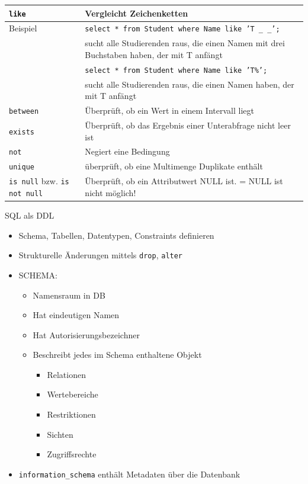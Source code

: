 \documentclass{article}
\begin{document}
\begin{center}
\begin{longtable}{|p{4cm}|p{7cm}|}
    \hline
    \texttt{like} & Vergleicht Zeichenketten \\
    \hline
    Beispiel & \texttt{select * from Student where Name like 'T \_ \_';} \\
    & sucht alle Studierenden raus, die einen Namen mit drei Buchstaben haben, der mit T anfängt\\
    & \texttt{select * from Student where Name like 'T\%';} \\
    & sucht alle Studierenden raus, die einen Namen haben, der mit T anfängt \\
    \hline
    \texttt{between} & Überprüft, ob ein Wert in einem Intervall liegt \\
    \hline
    \texttt{exists} & Überprüft, ob das Ergebnis einer Unterabfrage nicht leer ist \\
    \hline
    \texttt{not} & Negiert eine Bedingung \\
    \hline
    \texttt{unique} & überprüft, ob eine Multimenge Duplikate enthält \\
    \hline
    \texttt{is null} bzw. \texttt{is not null} & Überprüft, ob ein Attributwert NULL ist. = NULL ist nicht möglich! \\
    \hline
  \end{longtable}
\end{center}

\begin{block}{SQL als DDL}
  \begin{itemize}
    \item Schema, Tabellen, Datentypen, Constraints definieren
    \item Strukturelle Änderungen mittels \texttt{drop}, \texttt{alter}
    \item SCHEMA:
    \begin{itemize}
      \item Namensraum in DB
      \item Hat eindeutigen Namen
      \item Hat Autorisierungsbezeichner
      \item Beschreibt jedes im Schema enthaltene Objekt
      \begin{itemize}
        \item Relationen
        \item Wertebereiche
        \item Restriktionen
        \item Sichten
        \item Zugriffsrechte
      \end{itemize}
    \end{itemize}
    \item \texttt{information\_schema} enthält Metadaten über die Datenbank
  \end{itemize}
\end{block}
\end{document}
